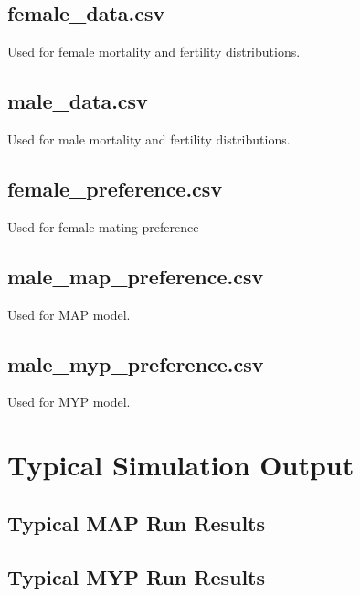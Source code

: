 \documentclass[authoryearcitations]{UoYCSproject}
\begin{document}
\section{female\_data.csv}
Used for female mortality and fertility distributions.

\section{male\_data.csv}
Used for male mortality and fertility distributions.

\section{female\_preference.csv}
Used for female mating preference

\section{male\_map\_preference.csv}
Used for MAP model.

\section{male\_myp\_preference.csv}
Used for MYP model.

\chapter{Typical Simulation Output}
\label{adx:typicalSimulationOutput}
\section{Typical MAP Run Results}


\section{Typical MYP Run Results}
\end{document}

